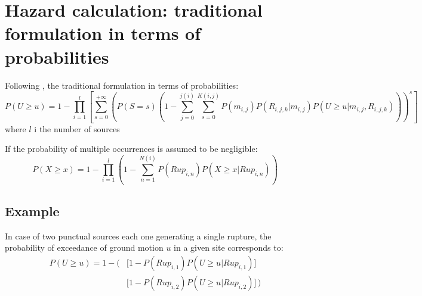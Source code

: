 \section{Hazard calculation: traditional formulation in terms of probabilities}
Following \cite{field2003}, the traditional formulation in terms of probabilities:
%
\begin{equation}
P(U\geq u)= 
	1-\prod\limits_{i=1}^{l} 
	\left[\sum\limits_{s=0}^{+\infty}
	\left(P(S=s) 
	\left(
		1-\sum\limits_{j=0}^{j(i)}\sum\limits_{s=0}^{K(i,j)} 
		P(m_{i,j}) 
		P(R_{i,j,k}|m_{i,j}) P(U\geq u|m_{i,j},R_{i,j,k})
	\right)
	\right)^{s}
	\right] 
\end{equation}
where $l$ i the number of sources 

If the probability of multiple occurrences is assumed to be negligible:
%
\begin{equation}
P(X\geq x)=1-\prod\limits_{i=1}^{l} 
	\left( 
		1-\sum\limits_{n=1}^{N(i)}P(Rup_{i,n})P(X\geq x|Rup_{i,n})
	\right)
\end{equation}

\subsection{Example}
In case of two punctual sources each one generating a single rupture, the 
probability of exceedance of ground motion $u$ in a given site corresponds to:
%
\begin{eqnarray}
P(U\geq u)=
	1-
	\biggl(& 
		\bigl[ 1-P(Rup_{i,1})P(U\geq u|Rup_{i,1}) \bigr] \nonumber \\
		& \bigl[ 1-P(Rup_{i,2})P(U\geq u|Rup_{i,2}) \bigr]
	\,\biggr)
\end{eqnarray}
